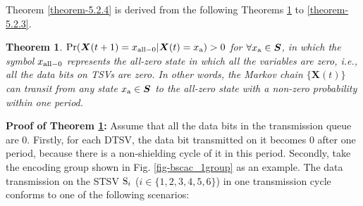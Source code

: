 \documentclass[lettersize,journal]{IEEEtran}
\newtheorem{theorem}{Theorem}
\begin{document}
{\appendix \label{sec-appendix}
%
%
%
%
%
%
Theorem \ref{theorem-5.2.4} is derived from the following Theorems \ref{theorem-5.2.1} to \ref{theorem-5.2.3}.
\begin{theorem}\label{theorem-5.2.1}
	${\rm Pr}( \boldsymbol{X}(t+1) = x_{\rm all-0} | \boldsymbol{X}(t) = x_{\rm a})>0$ for $\forall x_{\rm a}\in \boldsymbol{S}$, in which the symbol $x_{\rm all-0}$ represents the all-zero state in which all the variables are zero, i.e., all the data bits on TSVs are zero. In other words, the Markov chain $\{\boldsymbol{X}(t)\}$ can transit from any state $x_{\rm a}\in \boldsymbol{S}$ to the all-zero state with a non-zero probability within one period.
\end{theorem}

\noindent \textbf{Proof of Theorem \ref{theorem-5.2.1}:} Assume that all the data bits in the transmission queue are 0. Firstly, for each DTSV, the data bit transmitted on it becomes 0 after one period, because there is a non-shielding cycle of it in this period. Secondly, take the encoding group shown in Fig. \ref{fig-bscac_1group} as an example. The data transmission on the STSV ${\rm S}_i$ ($i\in \{1,2,3,4,5,6\}$) in one transmission cycle conforms to one of the following scenarios:

}
\end{document}
